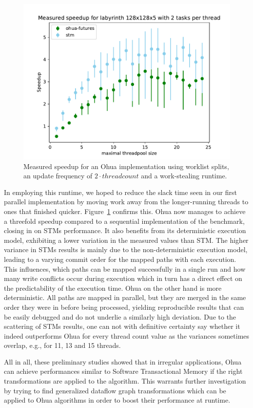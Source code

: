 \begin{figure}[b]
    \centering
    \includegraphics[width=.5\textwidth,keepaspectratio]{gfx/preliminaries-labyrinth/current-128x128x5}
    \caption{Measured speedup for an Ohua implementation using worklist splits, an update frequency of $2 \cdot threadcount$ and a work-stealing runtime.}%
    \label{fig:preliminaries:future-results}
\end{figure}

In employing this runtime, we hoped to reduce the slack time seen in our first parallel implementation by moving work away from the longer-running threads to ones that finished quicker.
Figure~\ref{fig:preliminaries:future-results} confirms this.
Ohua now manages to achieve a threefold speedup compared to a sequential implementation of the benchmark, closing in on STMs performance.
It also benefits from its deterministic execution model, exhibiting a lower variation in the measured values than STM.
The higher variance in STMs results is mainly due to the non-deterministic execution model, leading to a varying commit order for the mapped paths with each execution.
This influences, which paths can be mapped successfully in a single run and how many write conflicts occur during execution which in turn has a direct effect on the predictability of the execution time.
Ohua on the other hand is more deterministic.
All paths are mapped in parallel, but they are merged in the same order they were in before being processed, yielding reproducible results that can be easily debugged and do not underlie a similarly high deviation.
Due to the scattering of STMs results, one can not with definitive certainty say whether it indeed outperforms Ohua for every thread count value as the variances sometimes overlap, e.g., for 11, 13 and 15 threads.

All in all, these preliminary studies showed that in irregular applications, Ohua can achieve performances similar to Software Transactional Memory if the right transformations are applied to the algorithm.
This warrants further investigation by trying to find generalized dataflow graph transformations which can be applied to Ohua algorithms in order to boost their performance at runtime.

